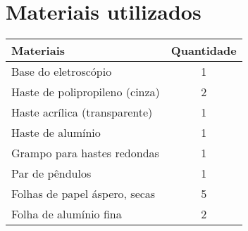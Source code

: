 \chapter{Materiais utilizados}

\begin{table}[H]
    \centering
    \begin{tabular}{lc}
        \hline
        Materiais                             & Quantidade \\ \hline
        Base do eletroscópio                  & 1          \\ \hline
        Haste de polipropileno (cinza)        & 2          \\ \hline
        Haste acrílica (transparente)         & 1          \\ \hline
        Haste de alumínio                     & 1          \\ \hline
        Grampo para hastes redondas           & 1          \\ \hline
        Par de pêndulos                       & 1          \\ \hline
        Folhas de papel áspero, secas         & 5          \\ \hline
        Folha de alumínio fina                & 2          \\ \hline
    \end{tabular}
\end{table}